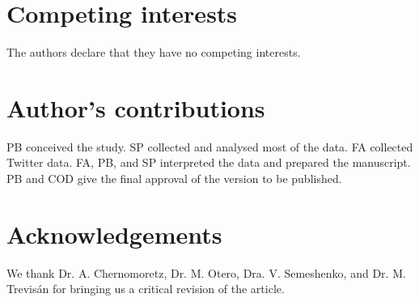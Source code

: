 \documentclass{bmcart}
\begin{document}

\begin{backmatter}

\section*{Competing interests}
  The authors declare that they have no competing interests.

\section*{Author's contributions}
PB conceived the study. SP collected and analysed most of the data. FA collected Twitter data. FA, PB, and SP interpreted the data and prepared the manuscript. PB and COD  give the final approval of the version to be published.

\section*{Acknowledgements}
  We thank Dr. A. Chernomoretz, Dr. M. Otero, Dra. V. Semeshenko, and Dr. M. Trevis\'an for bringing us a critical revision of the article.



\end{backmatter}
\end{document}
